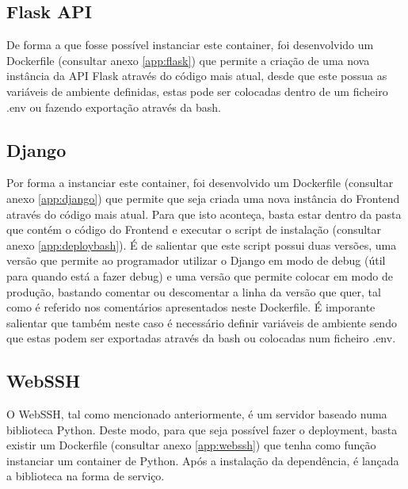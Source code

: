 \subsection{Flask API}
De forma a que fosse possível instanciar este container, foi desenvolvido um Dockerfile (consultar anexo \ref{app:flask}) que permite a criação de uma nova instância da API Flask através do código mais atual, desde que este possua as variáveis de ambiente definidas, estas pode ser colocadas dentro de um ficheiro .env ou fazendo exportação através da bash.

\subsection{Django}
Por forma a instanciar este container, foi desenvolvido um Dockerfile (consultar anexo \ref{app:django}) que permite que seja criada uma nova instância do Frontend através do código mais atual. Para que isto aconteça, basta estar dentro da pasta que contém o código do Frontend e executar o script de instalação (consultar anexo \ref{app:deploybash}).\newline
É de salientar que este script possui duas versões, uma versão que permite ao programador utilizar o Django em modo de debug (útil para quando está a fazer debug) e uma versão que permite colocar em modo de produção, bastando comentar ou descomentar a linha da versão que quer, tal como é referido nos comentários apresentados neste Dockerfile. É imporante salientar que também neste caso é necessário definir variáveis de ambiente sendo que estas podem ser exportadas através da bash ou colocadas num ficheiro .env.

\subsection{WebSSH}
O WebSSH, tal como mencionado anteriormente, é um servidor baseado numa biblioteca Python. Deste modo, para que seja possível fazer o deployment, basta existir um Dockerfile (consultar anexo \ref{app:webssh}) que tenha como função instanciar um container de Python. Após a instalação da dependência, é lançada a biblioteca na forma de serviço.
\newpage
\hfill\break
